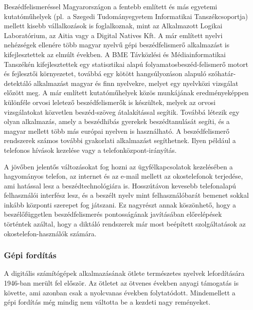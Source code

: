 \begin{multicols}{2}
Beszédfelismeréssel Magyarországon a fentebb említett és más egyetemi ku\-ta\-tó\-mű\-he\-lyek (pl.~a Szegedi Tu\-do\-mány\-egye\-tem Informatikai Tanszékcsoportja) mellett kisebb vállalkozások is foglalkoznak, mint az Alkalmazott Logikai La\-bo\-ra\-tó\-ri\-um, az Aitia vagy a Digital Natives Kft. A már említett nyelvi nehézségek ellenére több magyar nyelvű gépi beszédfelismerő alkalmazást is kifejlesztettek az elmúlt években. A BME Távközlési és Mé\-dia\-in\-for\-ma\-ti\-kai Tanszékén kifejlesztettek egy statisztikai alapú folyamatosbeszéd-felismerő motort és fejlesztői környezetet, továbbá egy kötött hangsúlyozáson alapuló szóhatár-detektáló alkalmazást ma\-gyar és finn nyelvekre, melyet egy nyelv\-kö\-zi vizsgálat előzött meg. A már említett kutatóműhelyek közös munkájának eredményeképpen különféle orvosi leletező beszédfelismerők is készültek, melyek az orvosi vizsgálatokat közvetlen beszéd-szöveg átalakítással segítik. Továbbá létezik egy olyan alkalmazás, amely a beszédhibás gyerekek beszédtanulását se\-gí\-ti, és a magyar mellett több más európai nyelven is használható. A beszédfelismerő rendszerek számos további gyakorlati alkalmazást segíthetnek. Ilyen például a telefonos hívások kezelése vagy a te\-le\-fon\-köz\-pont-irányítás.

A jövőben jelentős változásokat fog hozni az ügyfélkapcsolatok kezelésében a ha\-gyo\-má\-nyos telefon, az internet és az e-mail mellett az okostelefonok terjedése, ami hatással lesz a beszédtechnológiára is. Hosszútávon kevesebb telefonalapú felhasználói interfész lesz, és a beszélt nyelv mint felhasználóbarát bemenet sokkal inkább központi szerepet fog játszani. Ez nagyrészt annak köszönhető, hogy a beszélőfüggetlen beszédfelismerés pontosságának javításában előrelépések tör\-tén\-tek azáltal, hogy a diktáló rend\-sze\-rek már most beépített szolgáltatások az okostelefon-használók számára.

\subsubsection{Gépi fordítás}

A digitális számítógépek alkalmazásának ötlete természetes nyelvek lefordítására 1946-ban merült fel először. Az ötletet az ötvenes években anyagi támogatás is követte, ami azonban csak a nyolcvanas években folytatódott. Mindemellett a gépi fordítás még mindig nem váltotta be a kezdeti nagy reményeket.



\end{multicols}
